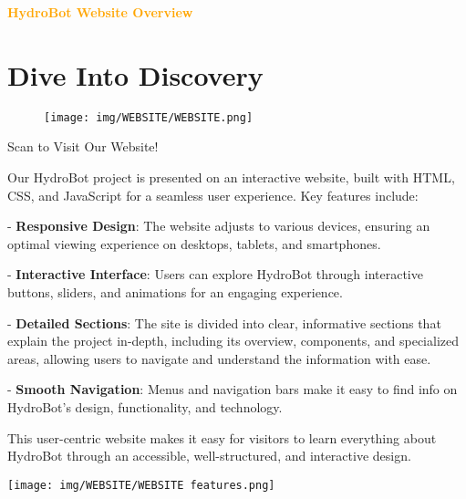 
\newpage
\begin{center}
    \huge \textbf{\textcolor{orange}{HydroBot Website Overview}} \\[0.5cm]
\end{center}

\section{\large \textbf{Dive Into Discovery}}

\begin{figure}[h!]
  \centering
  \begin{minipage}{0.6\textwidth}
    \centering
    \texttt{[image: img/WEBSITE/WEBSITE.png]}
  \end{minipage}%
    \begin{minipage}{0.4\textwidth}
        \centering
    \end{minipage}
\end{figure}

\begin{center}
    Scan to Visit Our Website!
\end{center}
    
Our HydroBot project is presented on an interactive website, built with HTML, CSS, and JavaScript for a seamless user experience. Key features include:

- \textbf{Responsive Design}: The website adjusts to various devices, ensuring an optimal viewing experience on desktops, tablets, and smartphones.
  
- \textbf{Interactive Interface}: Users can explore HydroBot through interactive buttons, sliders, and animations for an engaging experience.

- \textbf{Detailed Sections}: The site is divided into clear, informative sections that explain the project in-depth, including its overview, components, and specialized areas, allowing users to navigate and understand the information with ease.

- \textbf{Smooth Navigation}: Menus and navigation bars make it easy to find info on HydroBot's design, functionality, and technology.

This user-centric website makes it easy for visitors to learn everything about HydroBot through an accessible, well-structured, and interactive design.

\begin{center}
  \texttt{[image: img/WEBSITE/WEBSITE features.png]}
\end{center}

